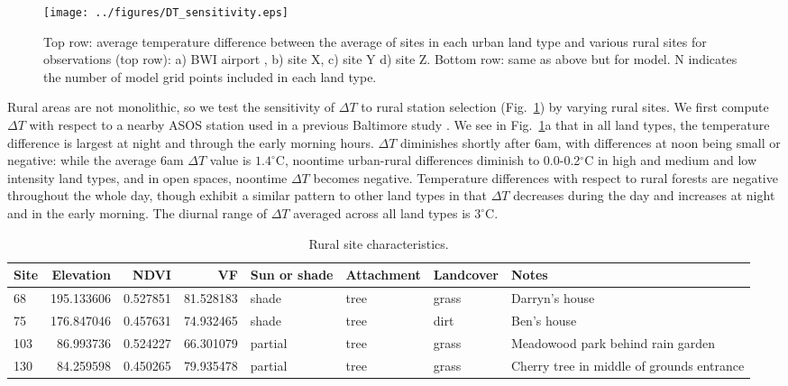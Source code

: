 \documentclass[draft,linenumbers]{agujournal}
\begin{document}
\begin{figure}[h]
\centering
\texttt{[image: ../figures/DT\_sensitivity.eps]}
\caption{Top row: average temperature difference between the average of sites in each urban land type and various rural sites for observations (top row): a) BWI airport , b) site X, c) site Y  d) site Z. Bottom row: same as above but for model. N indicates the number of model grid points included in each land type.
}
\label{fig:dt_sensitivity}
\end{figure}

Rural areas are not monolithic, so we test the sensitivity of $\Delta T$ to rural station selection  (Fig.~\ref{fig:dt_sensitivity}) by varying rural sites.
 We first compute $\Delta T$ with  respect to a nearby ASOS station used in a previous Baltimore study \citep{li2013synergistic}. We see in Fig.~\ref{fig:dt_sensitivity}a that
in all land types, the temperature difference is largest at night and through the early morning hours.
$\Delta T$ diminishes shortly after 6am, with differences at noon being small or negative: while the average 6am $\Delta T$ value  is $1.4^\circ $C, noontime urban-rural differences diminish to 0.0-0.2$^\circ$C in high and medium and low intensity land types, and in open spaces, noontime $\Delta T$ becomes negative.
Temperature differences with respect to rural forests are negative throughout the whole day, though exhibit a similar pattern to other land types in that $\Delta T$ decreases during the day and increases at night and in the early morning. The diurnal range of $\Delta T$ averaged across all land types is $3^\circ$C. 

\begin{table}
\begin{tabular}{lrrrllll}
\toprule
Site &   Elevation &      NDVI &         VF &  Sun or shade & Attachment & Landcover &  Notes \\
\midrule
68  &  195.133606 &  0.527851 &  81.528183 &      shade &       tree &          grass &                               Darryn's house \\
75  &  176.847046 &  0.457631 &  74.932465 &      shade &       tree &           dirt &                                Ben's house \\
103 &   86.993736 &  0.524227 &  66.301079 &    partial &       tree &          grass &          Meadowood park behind rain garden \\
130 &   84.259598 &  0.450265 &  79.935478 &    partial &       tree &          grass &  Cherry tree in middle of grounds entrance \\
\bottomrule
\end{tabular}

\caption{Rural site characteristics.}
\label{tab:rural_ibuttons}
\end{table}
\end{document}
